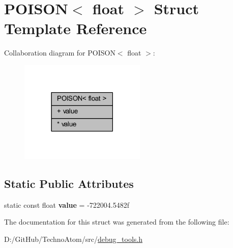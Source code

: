 \hypertarget{struct_p_o_i_s_o_n_3_01float_01_4}{}\section{P\+O\+I\+S\+ON$<$ float $>$ Struct Template Reference}
\label{struct_p_o_i_s_o_n_3_01float_01_4}


Collaboration diagram for P\+O\+I\+S\+ON$<$ float $>$\+:
\nopagebreak
\begin{figure}[H]
\begin{center}
\leavevmode
\includegraphics[width=170pt]{struct_p_o_i_s_o_n_3_01float_01_4__coll__graph}
\end{center}
\end{figure}
\subsection*{Static Public Attributes}
\textbf{ }\par
\begin{DoxyCompactItemize}
\item 
\mbox{\label{struct_p_o_i_s_o_n_3_01float_01_4_af865aaa1259e02b92b1d32bb981ce065}} 
static const float {\bfseries value} = -\/722004.\+5482f
\end{DoxyCompactItemize}



The documentation for this struct was generated from the following file\+:\begin{DoxyCompactItemize}
\item 
D\+:/\+Git\+Hub/\+Techno\+Atom/src/\hyperlink{debug__tools_8h}{debug\+\_\+tools.\+h}\end{DoxyCompactItemize}

